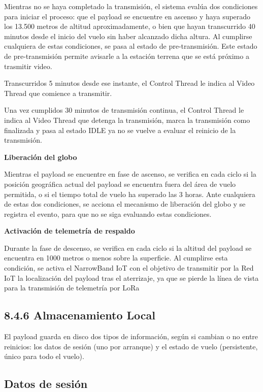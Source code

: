 \documentclass[12pt,a4paper]{article}
\begin{document}
Mientras no se haya completado la transmisión, el sistema evalúa dos condiciones para iniciar el proceso: que el payload se encuentre en ascenso y haya superado los 13.500 metros de altitud aproximadamente, o bien que hayan transcurrido 40 minutos desde el inicio del vuelo sin haber alcanzado dicha altura. Al cumplirse cualquiera de estas condiciones, se pasa al estado de pre-transmisión. Este estado de pre-transmisión permite avisarle a la estación terrena que se está próximo a trasmitir video.

Transcurridos 5 minutos desde ese instante, el Control Thread le indica al Video Thread que comience a transmitir.

Una vez cumplidos 30 minutos de transmisión continua, el Control Thread le indica al Video Thread que detenga la transmisión, marca la transmisión como finalizada y pasa al estado IDLE ya no se vuelve a evaluar el reinicio de la transmisión.

\textbf{Liberación del globo}

Mientras el payload se encuentre en fase de ascenso, se verifica en cada ciclo si la posición geográfica actual del payload se encuentra fuera del área de vuelo permitida, o si el tiempo total de vuelo ha superado las 3 horas. Ante cualquiera de estas dos condiciones, se acciona el mecanismo de liberación del globo y se registra el evento, para que no se siga evaluando estas condiciones.

\textbf{Activación de telemetría de respaldo}

Durante la fase de descenso, se verifica en cada ciclo si la altitud del payload se encuentra en 1000 metros o menos sobre la superficie. Al cumplirse esta condición, se activa el NarrowBand IoT con el objetivo de transmitir por la Red IoT la localización del payload tras el aterrizaje, ya que se pierde la línea de vista para la transmisión de telemetría por LoRa

\subsection{\texorpdfstring{8.4.6 Almacenamiento Local }{8.4.6 Almacenamiento Local }}\label{almacenamiento-local}

El payload guarda en disco dos tipos de información, según si cambian o no entre reinicios: los datos de sesión (uno por arranque) y el estado de vuelo (persistente, único para todo el vuelo).

\subsection{Datos de sesión}\label{datos-de-sesiuxf3n}
\end{document}

